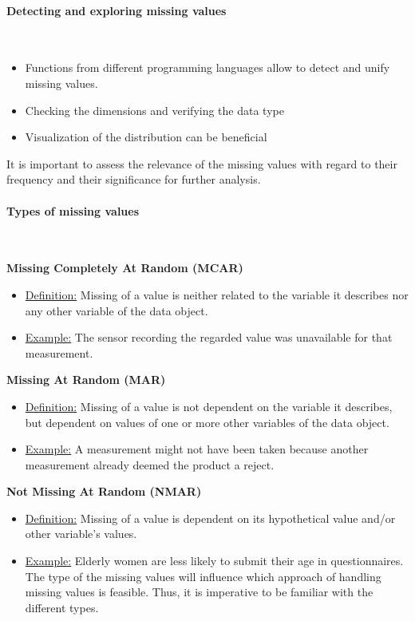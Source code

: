 \documentclass[12pt, a4paper, oneside, justified]{article}
\begin{document}
\paragraph*{Detecting and exploring missing values}~{}

\begin{itemize}
    \item Functions from different programming languages allow to detect and unify missing values.
    \item Checking the dimensions and verifying the data type
    \item Visualization of the distribution can be beneficial
\end{itemize}

It is important to assess the relevance of the missing values with regard to their frequency and their significance for further analysis.

\paragraph*{Types of missing values}~{}

\textbf{Missing Completely At Random (MCAR)}
\begin{itemize}
    \item \underline{Definition:} Missing of a value is neither related to the variable it describes nor any other variable of the data object.
    \item \underline{Example:} The sensor recording the regarded value was unavailable for that measurement.    
\end{itemize}

\textbf{Missing At Random (MAR)}
\begin{itemize}
    \item \underline{Definition:} Missing of a value is not dependent on the variable it describes, but dependent on values of one or more other variables of the data object.
    \item \underline{Example:} A measurement might not have been taken because another measurement already deemed the product a reject.    
\end{itemize}

\textbf{Not Missing At Random (NMAR)}
\begin{itemize}
    \item \underline{Definition:} Missing of a value is dependent on its hypothetical value and/or other variable's values.
    \item \underline{Example:} Elderly women are less likely to submit their age in questionnaires.    
    The type of the missing values will influence which approach of handling missing values is feasible. Thus, it is imperative to be familiar with the different types.
\end{itemize}
\end{document}
